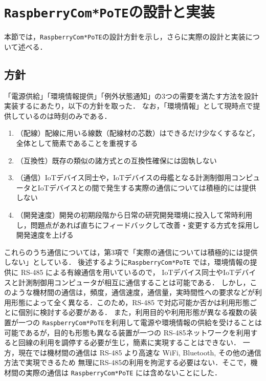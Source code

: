\section{{\tt Raspberry\-Com*PoTE}の設計と実装}
\label{sec:04design_and_implementation}

本節では，{\tt Raspberry\-Com*PoTE}の設計方針を示し，さらに実際の設計と実装について述べる．


\subsection{方針}

「電源供給」「環境情報提供」「例外状態通知」の3つの需要を満たす方法を設計実装するにあたり，以下の方針を取った．
なお，「環境情報」として現時点で提供しているのは時刻のみである．

\begin{enumerate}
\item （配線）配線に用いる線数（配線材の芯数）はできるだけ少なくするなど，全体として簡素であることを重視する
\item （互換性）既存の類似の諸方式との互換性確保には固執しない
\item （通信）IoTデバイス同士や，IoTデバイスの母艦となる計測制御用コンピュータとIoTデバイスとの間で発生する実際の通信については積極的には提供しない
\item （開発速度）開発の初期段階から日常の研究開発環境に投入して常時利用し，問題点があれば直ちにフィードバックして改善・変更する方式を採用し開発速度を上げる
\end{enumerate}


これらのうち通信については，第3項で「実際の通信については積極的には提供しない」としている．
後述するように{\tt Raspberry\-Com*PoTE} では，環境情報の提供に RS-485 による有線通信を用いているので，
IoTデバイス同士やIoTデバイスと計測制御用コンピュータが相互に通信することは可能である．
しかし，このような機材間の通信は，頻度，通信速度，通信量，実時間性への要求などが利用形態によって全く異なる．このため，RS-485 で対応可能か否かは利用形態ごとに個別に検討する必要がある．
また，利用目的や利用形態が異なる複数の装置が一つの {\tt Raspberry\-Com*PoTE}を利用して電源や環境情報の供給を受けることは可能であるが，目的も形態も異なる装置が一つの RS-485ネットワークを利用すると回線の利用を調停する必要が生じ，簡素に実現することはできない．
一方，現在では機材間の通信は RS-485 より高速な WiFi, Bluetooth, その他の通信方法で実現できるため
無理にRS-485の利用を拘泥する必要はない．そこで，機材間の実際の通信は {\tt Raspberry\-Com*PoTE} には含めないことにした．

